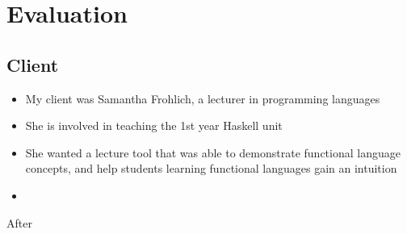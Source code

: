 \chapter{Evaluation}

\section{Client}
\begin{itemize}
    \item My client was Samantha Frohlich, a lecturer in programming languages
    \item She is involved in teaching the 1st year Haskell unit
    \item She wanted a lecture tool that was able to demonstrate functional language concepts, and help students learning functional languages gain an intuition
    \item 
\end{itemize}

After 